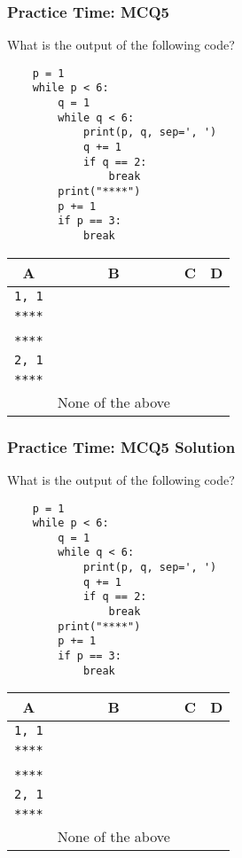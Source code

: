 \documentclass{beamer}
\begin{document}
\begin{frame}[fragile]
    \frametitle{Practice Time: MCQ5}
    What is the output of the following code?

    \begin{small}
        \begin{verbatim}
    p = 1
    while p < 6:
        q = 1
        while q < 6:
            print(p, q, sep=', ')
            q += 1
            if q == 2:
                break
        print("****")
        p += 1
        if p == 3:
            break
        \end{verbatim}

        \begin{tabular}{|c|c|c|c|}
            \hline
            A & B & C & D \\\hline
            \texttt{1, 1}
              &
            \makecell[tl]{
            \texttt{1, 1} \\
            \texttt{****} \\
            }
              &
            \makecell[tl]{
            \texttt{1, 1} \\
            \texttt{****} \\
            \texttt{2, 1} \\
            \texttt{****} \\
            }
              &
            None of the above
            \\\hline
        \end{tabular}
    \end{small}
\end{frame}
\begin{frame}[fragile]
    \frametitle{Practice Time: MCQ5 Solution}
    What is the output of the following code?
    \begin{small}
        \begin{verbatim}
    p = 1
    while p < 6:
        q = 1
        while q < 6:
            print(p, q, sep=', ')
            q += 1
            if q == 2:
                break
        print("****")
        p += 1
        if p == 3:
            break
        \end{verbatim}

        \begin{tabular}{|c|c|c|c|}
            \hline
            A & B & \alert{C} & D \\\hline
            \texttt{1, 1}
              &
            \makecell[tl]{
            \texttt{1, 1}         \\
            \texttt{****}         \\
            }
              &
            \alert{\makecell[tl]{
            \texttt{1, 1}         \\
            \texttt{****}         \\
            \texttt{2, 1}         \\
            \texttt{****}         \\
                }}
              &
            None of the above
            \\\hline
        \end{tabular}
    \end{small}
\end{frame}
\end{document}
